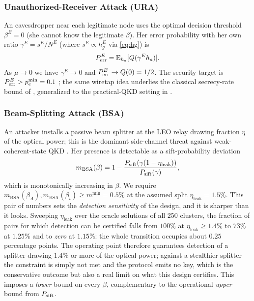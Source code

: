 \subsubsection{Unauthorized-Receiver Attack (URA)}
An eavesdropper near each legitimate node uses the optimal decision threshold $\beta^E = 0$ (she cannot know the legitimate $\beta$). Her error probability with her own ratio $\gamma^E = s^E/N^E$ (where $s^E \propto h_g^E$ via \eqref{eq:hg}) is
\begin{equation}
  P_{\mathrm{err}}^E = \mathbb{E}_{h_a}[Q(\gamma^E h_a)].\label{eq:eve}
\end{equation}
As $\mu \to 0$ we have $\gamma^E \to 0$ and $P_{\mathrm{err}}^E \to Q(0) = 1/2$. The security target is $P_{\mathrm{err}}^E > p_e^{\min} = 0.1$ \cite[Sec.~V-B]{vu2023photonics}; the same wiretap idea underlies the classical secrecy-rate bound of \cite{wyner1975wiretap}, generalized to the practical-QKD setting in \cite{lutkenhaus1999estimates,scarani2009security}.

\subsubsection{Beam-Splitting Attack (BSA)}
An attacker installs a passive beam splitter at the LEO relay drawing fraction $\eta$ of the optical power; this is the dominant side-channel threat against weak-coherent-state QKD \cite{huttner1995quantum,lutkenhaus1999estimates}. Her presence is detectable as a sift-probability deviation
\begin{equation}
  m_{\mathrm{BSA}}(\beta) = 1 - \frac{P_{\mathrm{sift}}(\gamma(1-\eta_{\mathrm{leak}}))}{P_{\mathrm{sift}}(\gamma)},
\end{equation}
which is monotonically increasing in $\beta$. We require $m_{\mathrm{BSA}}(\beta_A), m_{\mathrm{BSA}}(\beta_i) \ge m^{\min}{=}0.5\%$ at the assumed split $\eta_{\mathrm{leak}}{=}1.5\%$. This pair of numbers sets the \emph{detection sensitivity} of the design, and it is sharper than it looks. Sweeping $\eta_{\mathrm{leak}}$ over the oracle solutions of all $250$ clusters, the fraction of pairs for which detection can be certified falls from $100\%$ at $\eta_{\mathrm{leak}}{\ge}1.4\%$ to $73\%$ at $1.25\%$ and to \emph{zero} at $1.15\%$: the whole transition occupies about $0.25$ percentage points. The operating point therefore guarantees detection of a splitter drawing $1.4\%$ or more of the optical power; against a stealthier splitter the constraint is simply not met and the protocol emits no key, which is the conservative outcome but also a real limit on what this design certifies. This imposes a \emph{lower} bound on every $\beta$, complementary to the operational \emph{upper} bound from $P_{\mathrm{sift}}$.

